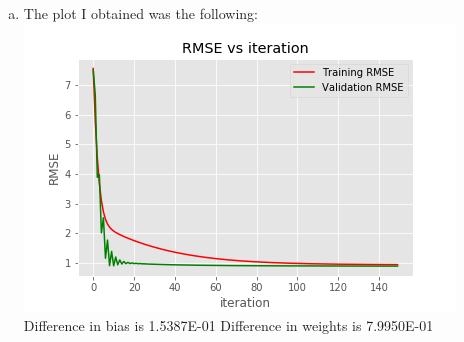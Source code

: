\documentclass[12pt,letterpaper]{hmcpset}
\begin{document}
\begin{solution}
\begin{enumerate}[(d)]
        \item The plot I obtained was the following:\newline
        \includegraphics[scale = 0.7]{Images/convergence.png}\newline
        Difference in bias is  1.5387E-01 \newline
        Difference in weights is  7.9950E-01
	\end{enumerate}
\end{solution}
\newpage
\end{document}
